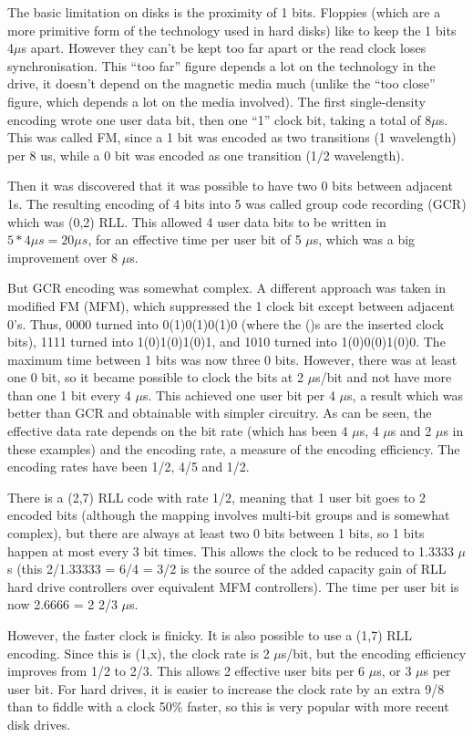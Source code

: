 The basic limitation on disks is the proximity of 1 bits.  Floppies (which are
a more primitive form of the technology used in hard disks) like to keep the 1
bits 4$\mu$s apart.  However they can't be kept too far apart or the read clock
loses synchronisation.  This ``too far'' figure depends a lot on the technology
in the drive, it doesn't depend on the magnetic media much (unlike the ``too
close'' figure, which depends a lot on the media involved).  The first
single-density encoding wrote one user data bit, then one ``1'' clock bit, taking
a total of 8$\mu$s.  This was called FM, since a 1 bit was encoded as two
transitions (1 wavelength) per 8 us, while a 0 bit was encoded as one
transition (1/2 wavelength).

Then it was discovered that it was possible to have two 0 bits between adjacent
1s.  The resulting encoding of 4 bits into 5 was called group code recording
(GCR) which was (0,2) RLL.  This allowed 4 user data bits to be written in
$5 * 4\mu s = 20 \mu s$, for an effective time per user bit of 5 $\mu$s, which was a big
improvement over 8 $\mu$s.

But GCR encoding was somewhat complex.  A different approach was taken in
modified FM (MFM), which suppressed the 1 clock bit except between adjacent
0's.  Thus, 0000 turned into 0(1)0(1)0(1)0 (where the ()s are the inserted
clock bits), 1111 turned into 1(0)1(0)1(0)1, and 1010 turned into
1(0)0(0)1(0)0.  The maximum time between 1 bits was now three 0 bits.  However,
there was at least one 0 bit, so it became possible to clock the bits at
2 $\mu$s/bit and not have more than one 1 bit every 4 $\mu$s.  This achieved one user bit
per 4 $\mu$s, a result which was better than GCR and obtainable with simpler
circuitry.  As can be seen, the effective data rate depends on the bit rate
(which has been 4 $\mu$s, 4 $\mu$s and 2 $\mu$s in these examples) and the encoding rate, a
measure of the encoding efficiency. The encoding rates have been 1/2, 4/5 and
1/2.

There is a (2,7) RLL code with rate 1/2, meaning that 1 user bit goes to 2
encoded bits (although the mapping involves multi-bit groups and is somewhat
complex), but there are always at least two 0 bits between 1 bits, so 1 bits
happen at most every 3 bit times.  This allows the clock to be reduced to
1.3333 $\mu$s (this 2/1.33333 = 6/4 = 3/2 is the source of the added capacity gain
of RLL hard drive controllers over equivalent MFM controllers).  The time per
user bit is now 2.6666 = 2 2/3 $\mu$s.

However, the faster clock is finicky.  It is also possible to use a (1,7) RLL
encoding.  Since this is (1,x), the clock rate is 2 $\mu$s/bit, but the encoding
efficiency improves from 1/2 to 2/3.  This allows 2 effective user bits per 6
$\mu$s, or 3 $\mu$s per user bit.  For hard drives, it is easier to increase the clock
rate by an extra 9/8 than to fiddle with a clock 50\% faster, so this is very
popular with more recent disk drives.

